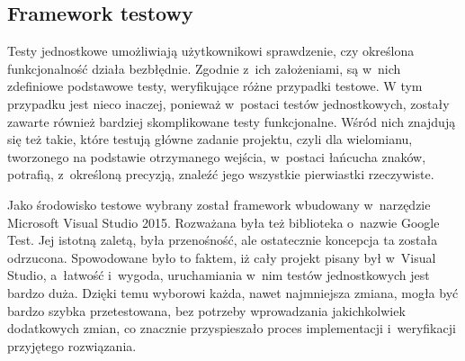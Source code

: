 \subsection{Framework testowy}
Testy jednostkowe umożliwiają użytkownikowi sprawdzenie, czy określona funkcjonalność działa bezbłędnie. Zgodnie z~ich założeniami, są w~nich zdefiniowe podstawowe testy, weryfikujące różne przypadki testowe. W tym przypadku jest nieco inaczej, ponieważ w~postaci testów jednostkowych, zostały zawarte również bardziej skomplikowane testy funkcjonalne. Wśród nich znajdują się też takie, które testują główne zadanie projektu, czyli dla wielomianu, tworzonego na podstawie otrzymanego wejścia, w~postaci łańcucha znaków, potrafią, z~określoną precyzją, znaleźć jego wszystkie pierwiastki rzeczywiste.

Jako środowisko testowe wybrany został framework wbudowany w~narzędzie Microsoft Visual Studio 2015. Rozważana była też biblioteka o~nazwie Google Test. Jej istotną zaletą, była przenośność, ale ostatecznie koncepcja ta została odrzucona. Spowodowane było to faktem, iż cały projekt pisany był w~Visual Studio, a~łatwość i~wygoda, uruchamiania w~nim testów jednostkowych jest bardzo duża. Dzięki temu wyborowi każda, nawet najmniejsza zmiana, mogła być bardzo szybka przetestowana, bez potrzeby wprowadzania jakichkolwiek dodatkowych zmian, co znacznie przyspieszało proces implementacji i~weryfikacji przyjętego rozwiązania.